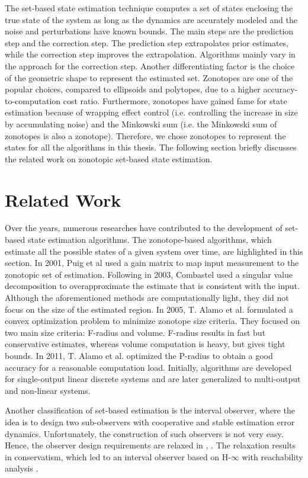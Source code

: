 The set-based state estimation technique computes a set of states enclosing the true state of the system as long as the dynamics are accurately modeled and the noise and perturbations have known bounds. The main steps are the prediction step and the correction step. The prediction step extrapolates prior estimates, while the correction step improves the extrapolation. Algorithms mainly vary in the approach for the correction step. Another differentiating factor is the choice of the geometric shape to represent the estimated set. Zonotopes are one of the popular choices, compared to ellipsoids and polytopes, due to a higher accuracy-to-computation cost ratio. Furthermore, zonotopes have gained fame for state estimation because of wrapping effect control \cite{Kuhn1998} (i.e. controlling the increase in size by accumulating noise) and the Minkowski sum (i.e. the Minkowski sum of zonotopes is also a zonotope). Therefore, we chose zonotopes to represent the states for all the algorithms in this thesis. The following section briefly discusses the related work on zonotopic set-based state estimation.


\section{Related Work}
Over the years, numerous researches have contributed to the development of set-based state estimation algorithms. The zonotope-based algorithms, which estimate all the possible states of a given system over time, are highlighted in this section. In 2001, Puig et al \cite{Puig2001} used a gain matrix to map input measurement to the zonotopic set of estimation. Following in 2003, Combastel \cite{Combastel2003} used a singular value decomposition to overapproximate the estimate that is consistent with the input. Although the aforementioned methods are computationally light, they did not focus on the size of the estimated region. In 2005, T. Alamo et al. \cite{Alamo2005} formulated a convex optimization problem to minimize zonotope size criteria. They focused on two main size criteria: F-radius and volume. F-radius results in fast but conservative estimates, whereas volume computation is heavy, but gives tight bounds. In 2011, T. Alamo et al. \cite{Le2012} optimized the P-radius to obtain a good accuracy for a reasonable computation load. Initially, algorithms are developed for single-output linear discrete systems and are later generalized to multi-output and non-linear systems.  

Another classification of set-based estimation is the interval observer, where the idea is to design two sub-observers with cooperative and stable estimation error dynamics. Unfortunately, the construction of such observers is not very easy. Hence, the observer design requirements are relaxed in  \cite{Mazenc2011}, \cite{Raissi2012}. The relaxation results in conservatism, which led to an interval observer based on H-$\infty$ with reachability analysis \cite{Tang2019}.

